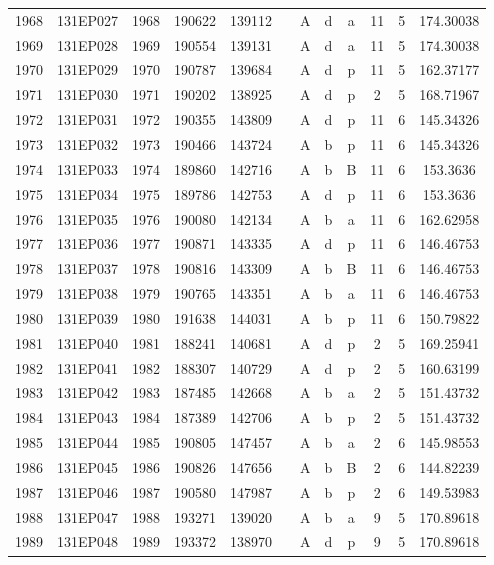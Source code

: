 \begin{tabular}{|*{12}{c|}}
1968 & 131EP027 & 1968 & 190622 & 139112 &  & A & d & a & 11 & 5 & 174.30038 \\ 
1969 & 131EP028 & 1969 & 190554 & 139131 &  & A & d & a & 11 & 5 & 174.30038 \\ 
1970 & 131EP029 & 1970 & 190787 & 139684 &  & A & d & p & 11 & 5 & 162.37177 \\ 
1971 & 131EP030 & 1971 & 190202 & 138925 &  & A & d & p & 2 & 5 & 168.71967 \\ 
1972 & 131EP031 & 1972 & 190355 & 143809 &  & A & d & p & 11 & 6 & 145.34326 \\ 
1973 & 131EP032 & 1973 & 190466 & 143724 &  & A & b & p & 11 & 6 & 145.34326 \\ 
1974 & 131EP033 & 1974 & 189860 & 142716 &  & A & b & B & 11 & 6 & 153.3636 \\ 
1975 & 131EP034 & 1975 & 189786 & 142753 &  & A & d & p & 11 & 6 & 153.3636 \\ 
1976 & 131EP035 & 1976 & 190080 & 142134 &  & A & b & a & 11 & 6 & 162.62958 \\ 
1977 & 131EP036 & 1977 & 190871 & 143335 &  & A & d & p & 11 & 6 & 146.46753 \\ 
1978 & 131EP037 & 1978 & 190816 & 143309 &  & A & b & B & 11 & 6 & 146.46753 \\ 
1979 & 131EP038 & 1979 & 190765 & 143351 &  & A & b & a & 11 & 6 & 146.46753 \\ 
1980 & 131EP039 & 1980 & 191638 & 144031 &  & A & b & p & 11 & 6 & 150.79822 \\ 
1981 & 131EP040 & 1981 & 188241 & 140681 &  & A & d & p & 2 & 5 & 169.25941 \\ 
1982 & 131EP041 & 1982 & 188307 & 140729 &  & A & d & p & 2 & 5 & 160.63199 \\ 
1983 & 131EP042 & 1983 & 187485 & 142668 &  & A & b & a & 2 & 5 & 151.43732 \\ 
1984 & 131EP043 & 1984 & 187389 & 142706 &  & A & b & p & 2 & 5 & 151.43732 \\ 
1985 & 131EP044 & 1985 & 190805 & 147457 &  & A & b & a & 2 & 6 & 145.98553 \\ 
1986 & 131EP045 & 1986 & 190826 & 147656 &  & A & b & B & 2 & 6 & 144.82239 \\ 
1987 & 131EP046 & 1987 & 190580 & 147987 &  & A & b & p & 2 & 6 & 149.53983 \\ 
1988 & 131EP047 & 1988 & 193271 & 139020 &  & A & b & a & 9 & 5 & 170.89618 \\ 
1989 & 131EP048 & 1989 & 193372 & 138970 &  & A & d & p & 9 & 5 & 170.89618 \\ 

\end{tabular}
